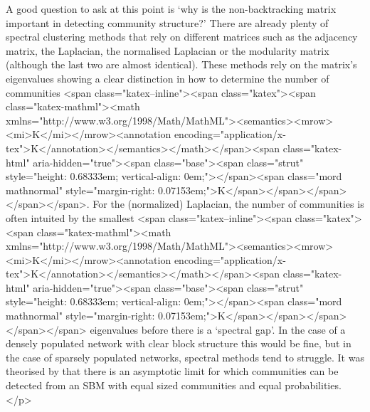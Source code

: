 A good question to ask at this point is ‘why is the non-backtracking matrix important in detecting community structure?’ There are already plenty of spectral clustering methods that rely on different matrices such as the adjacency matrix, the Laplacian, the normalised Laplacian or the modularity matrix (although the last two are almost identical). These methods rely on the matrix’s eigenvalues showing a clear distinction in how to determine the number of communities <span class="katex--inline"><span class="katex"><span class="katex-mathml"><math xmlns="http://www.w3.org/1998/Math/MathML"><semantics><mrow><mi>K</mi></mrow><annotation encoding="application/x-tex">K</annotation></semantics></math></span><span class="katex-html" aria-hidden="true"><span class="base"><span class="strut" style="height: 0.68333em; vertical-align: 0em;"></span><span class="mord mathnormal" style="margin-right: 0.07153em;">K</span></span></span></span></span>. For the (normalized) Laplacian, the number of communities is often intuited by the smallest <span class="katex--inline"><span class="katex"><span class="katex-mathml"><math xmlns="http://www.w3.org/1998/Math/MathML"><semantics><mrow><mi>K</mi></mrow><annotation encoding="application/x-tex">K</annotation></semantics></math></span><span class="katex-html" aria-hidden="true"><span class="base"><span class="strut" style="height: 0.68333em; vertical-align: 0em;"></span><span class="mord mathnormal" style="margin-right: 0.07153em;">K</span></span></span></span></span> eigenvalues before there is a ‘spectral gap’. In the case of a densely populated network with clear block structure this would be fine, but in the case of sparsely populated networks, spectral methods tend to struggle. It was theorised by \cite{decelle2011asymptotic} that there is an asymptotic limit for which communities can be detected from an SBM with equal sized communities and equal probabilities.</p>

